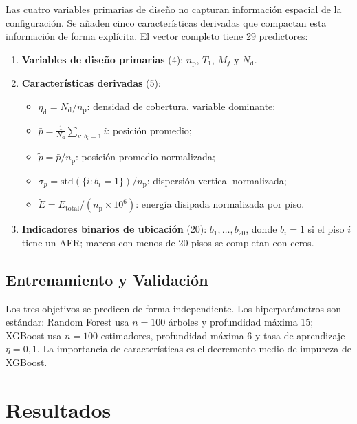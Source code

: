 \documentclass[preprint,12pt,authoryear]{elsarticle}
\newcommand{\nd}{N_{\mathrm{d}}}
\newcommand{\np}{n_{\mathrm{p}}}
\newcommand{\etad}{\eta_{\mathrm{d}}}
\newcommand{\Mf}{M_{\!f}}
\begin{document}
Las cuatro variables primarias de diseño no capturan información espacial de la
configuración. Se añaden cinco características derivadas que compactan esta
información de forma explícita. El vector completo tiene 29 predictores:

\begin{enumerate}[label=\textit{\roman*})]
    \item \textbf{Variables de diseño primarias} (4):
          $\np$, $T_1$, $\Mf$ y $\nd$.

    \item \textbf{Características derivadas} (5):
    \begin{itemize}
        \item $\etad = \nd/\np$: densidad de cobertura, variable dominante;
        \item $\bar{p} = \tfrac{1}{\nd}\sum_{i:\,b_i=1} i$: posición promedio;
        \item $\tilde{p} = \bar{p}/\np$: posición promedio normalizada;
        \item $\sigma_p = \mathrm{std}\!\left(\{i:b_i=1\}\right)/\np$:
              dispersión vertical normalizada;
        \item $\tilde{E} = E_{\mathrm{total}}/(\np\times10^6)$: energía
              disipada normalizada por piso.
    \end{itemize}

    \item \textbf{Indicadores binarios de ubicación} (20):
          $b_1,\ldots,b_{20}$, donde $b_i=1$ si el piso $i$ tiene un AFR;
          marcos con menos de 20 pisos se completan con ceros.
\end{enumerate}

\subsection{Entrenamiento y Validación}
\label{sec:method:entrenamiento}

Los tres objetivos se predicen de forma independiente. Los hiperparámetros son
estándar: Random Forest usa $n=100$ árboles y profundidad máxima 15; XGBoost
usa $n=100$ estimadores, profundidad máxima 6 y tasa de aprendizaje $\eta=0{,}1$.
La importancia de características es el decremento medio de impureza de XGBoost.

\section{Resultados}
\label{sec:results}
\end{document}
